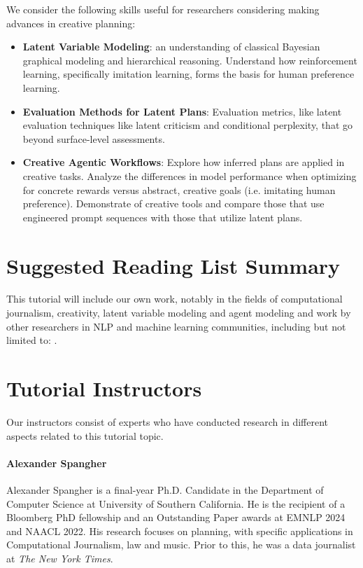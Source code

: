 \documentclass[11pt]{article}
\begin{document}
We consider the following skills useful for researchers considering making advances in creative planning:
\begin{itemize}
%
\item \textbf{Latent Variable Modeling}: an understanding of classical Bayesian graphical modeling and hierarchical reasoning. Understand how reinforcement learning, specifically imitation learning, forms the basis for human preference learning. 
%
\item \textbf{Evaluation Methods for Latent Plans}: Evaluation metrics, like latent evaluation techniques like latent criticism and conditional perplexity, that go beyond surface-level assessments.
%
\item \textbf{Creative Agentic Workflows}: Explore how inferred plans are applied in creative tasks. Analyze the differences in model performance when optimizing for concrete rewards versus abstract, creative goals (i.e. imitating human preference). Demonstrate of creative tools and compare those that use engineered prompt sequences with those that utilize latent plans.
\end{itemize}


\section{Suggested Reading List Summary}

This tutorial will include our own work, notably in the fields of computational journalism, creativity, latent variable modeling and agent modeling \cite{huang2024anovel, spangher2024pressrelease, spangher2024explaining, welsh2024explaining, spangher2021multitask, lu2024newsinterview, tian2023macgyver} and work by other researchers in NLP and machine learning communities, including but not limited to: \cite{petridis2023anglekindling, shi2023large, deng2023mind2web, schick2023toolformer, ALFRED20, chakrabarty-etal-2023-creative, zelikman2022star}.

\section{Tutorial Instructors}
Our instructors consist of experts who have conducted research in different aspects 
related to this tutorial topic.

\paragraph{Alexander Spangher} Alexander Spangher is a final-year Ph.D. Candidate in the Department of Computer Science at University of Southern California. He is the recipient of a Bloomberg PhD fellowship and an Outstanding Paper awards at EMNLP 2024 and NAACL 2022. His research focuses on planning, with specific applications in Computational Journalism, law and music. Prior to this, he was a data journalist at \textit{The New York Times}.
\end{document}
